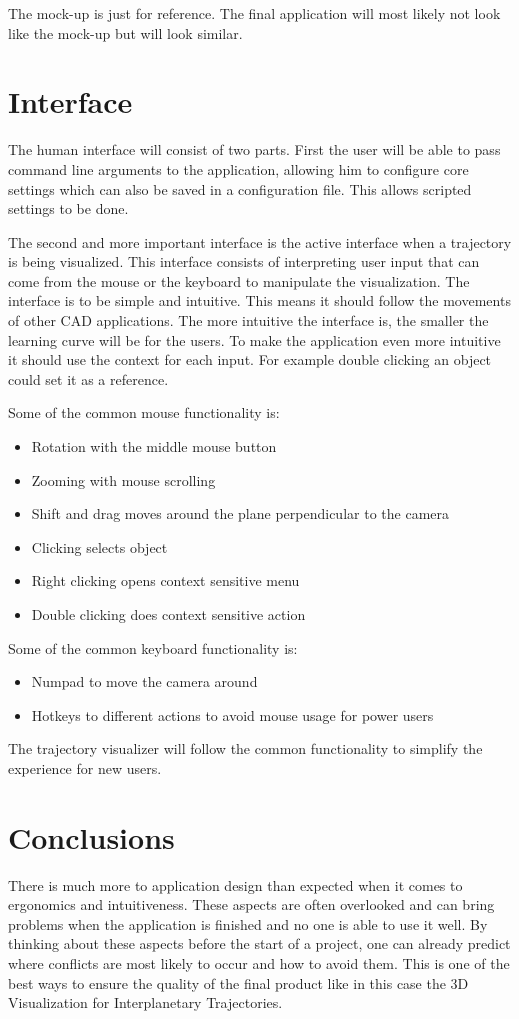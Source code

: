 \documentclass[a4paper,11pt]{article}
\begin{document}
The mock-up is just for reference. The final application will most likely not look like the mock-up but will look similar. 


\section{Interface}

The human interface will consist of two parts. First the user will be able to pass command line arguments to the application, allowing him to configure core settings which can also be saved in a configuration file. This allows scripted settings to be done.

The second and more important interface is the active interface when a trajectory is being visualized. This interface consists of interpreting user input that can come from the mouse or the keyboard to manipulate the visualization. The interface is to be simple and intuitive. This means it should follow the movements of other CAD applications. The more intuitive the interface is, the smaller the learning curve will be for the users. To make the application even more intuitive it should use the context for each input. For example double clicking an object could set it as a reference.

Some of the common mouse functionality is:
\begin{itemize}
\item Rotation with the middle mouse button
\item Zooming with mouse scrolling
\item Shift and drag moves around the plane perpendicular to the camera
\item Clicking selects object
\item Right clicking opens context sensitive menu
\item Double clicking does context sensitive action
\end{itemize}

Some of the common keyboard functionality is:
\begin{itemize}
\item Numpad to move the camera around
\item Hotkeys to different actions to avoid mouse usage for power users
\end{itemize}

The trajectory visualizer will follow the common functionality to simplify the experience for new users.


\section{Conclusions}

There is much more to application design than expected when it comes to ergonomics and intuitiveness. These aspects are often overlooked and can bring problems when the application is finished and no one is able to use it well. By thinking about these aspects before the start of a project, one can already predict where conflicts are most likely to occur and how to avoid them. This is one of the best ways to ensure the quality of the final product like in this case the 3D Visualization for Interplanetary Trajectories.
\end{document}
